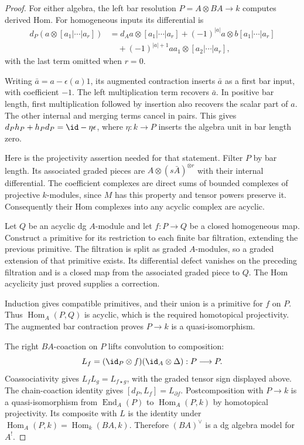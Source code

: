 \begin{proof}
For either algebra, the left bar resolution $P=A\otimes BA\to k$ computes derived Hom.
For homogeneous inputs its differential is
\[
 \begin{aligned}
 d_P(a\otimes[a_1|\cdots|a_r])
 &=d_Aa\otimes[a_1|\cdots|a_r]
   +(-1)^{|a|}a\otimes b[a_1|\cdots|a_r]\\
 &\quad+(-1)^{|a|+1}aa_1\otimes[a_2|\cdots|a_r],
 \end{aligned}
\]
with the last term omitted when $r=0$.

Writing $\bar a=a-\epsilon(a)1$, its augmented contraction inserts $\bar a$ as a first bar input, with coefficient $-1$.
The left multiplication term recovers $\bar a$.
In positive bar length, first multiplication followed by insertion also recovers the scalar part of $a$.
The other internal and merging terms cancel in pairs.
This gives $d_Ph_P+h_Pd_P=\id-\eta\epsilon$, where $\eta:k\to P$ inserts the algebra unit in bar length zero.

Here is the projectivity assertion needed for that statement.
Filter $P$ by bar length.
Its associated graded pieces are $A\otimes(s\bar A)^{\otimes r}$ with their internal differential.
The coefficient complexes are direct sums of bounded complexes of projective $k$-modules, since $M$ has this property and tensor powers preserve it.
Consequently their Hom complexes into any acyclic complex are acyclic.

Let $Q$ be an acyclic dg $A$-module and let $f:P\to Q$ be a closed homogeneous map.
Construct a primitive for its restriction to each finite bar filtration, extending the previous primitive.
The filtration is split as graded $A$-modules, so a graded extension of that primitive exists.
Its differential defect vanishes on the preceding filtration and is a closed map from the associated graded piece to $Q$.
The Hom acyclicity just proved supplies a correction.

Induction gives compatible primitives, and their union is a primitive for $f$ on $P$.
Thus $\operatorname{Hom}_A(P,Q)$ is acyclic, which is the required homotopical projectivity.
The augmented bar contraction proves $P\to k$ is a quasi-isomorphism.

The right $BA$-coaction on $P$ lifts convolution to composition:
\[
 L_f=(\id_P\otimes f)(\id_A\otimes\Delta):P\longrightarrow P.
\]
Coassociativity gives $L_fL_g=L_{f\star g}$, with the graded tensor sign displayed above.
The chain-coaction identity gives $[d_P,L_f]=L_{\partial f}$.
Postcomposition with $P\to k$ is a quasi-isomorphism from $\operatorname{End}_A(P)$ to $\operatorname{Hom}_A(P,k)$ by homotopical projectivity.
Its composite with $L$ is the identity under $\operatorname{Hom}_A(P,k)=\operatorname{Hom}_k(BA,k)$.
Therefore $(BA)^\vee$ is a dg algebra model for $A^!$.


\end{proof}
